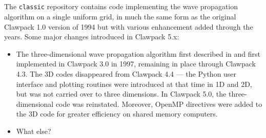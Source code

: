 %
%
%

\subsection{\classic}
The \texttt{classic} repository contains code implementing the wave
propagation algorithm on a single uniform grid, in much the same form as the
original Clawpack 1.0 version of 1994 but with various enhancement added
through the years.  Some major changes introduced in Clawpack 5.x:
\begin{itemize}
    \item The three-dimensional wave propagation algorithm first described
in \cite{jol:thesis, jol-rjl:3d} 
and first implemented in Clawpack 3.0 in 1997, remaining in place through
Clawpack 4.3.  The 3D codes 
disappeared from Clawpack 4.4 --- the Python user interface and plotting
routines were introduced at that time in 1D and 2D, but was not 
carried over to three dimensions.  In Clawpack 5.0, the three-dimensional
code was reinstated.  Moreover, OpenMP directives were added to the 3D code
for greater efficiency on shared memory computers.

    \item What else?

\end{itemize}

